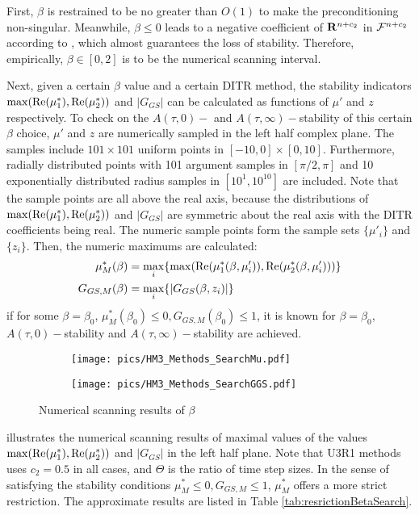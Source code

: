 First, $\beta$ is restrained to be no greater than $O(1)$ to make
the preconditioning non-singular.
Meanwhile, $\beta\leq 0$ leads to a negative coefficient of $\mathbf{R}^{n+c_2}$
in $\mathcal{F}^{n+c_2}$ according to , which almost
guarantees the loss of stability. Therefore, empirically, $\beta\in[0,2]$
is to be the numerical scanning interval.

Next, given a certain $\beta$ value and a certain DITR method, the
stability indicators $\max(\mathrm{Re}(\mu^*_1),\mathrm{Re}(\mu^*_2))$ and $|G_{GS}|$
can be calculated as functions of $\mu'$ and $z$ respectively.
To check on the $A(\tau,0)-$ and $A(\tau,\infty)-$stability of this
certain $\beta$ choice, $\mu'$ and $z$ are numerically sampled
in the left half complex plane. The samples include $101\times101$
uniform points in $[-10,0]\times[0,10]$. Furthermore, radially distributed
points with 101 argument samples in $[\pi/2,\pi]$ and 10 exponentially
distributed radius samples in $[10^1, 10^{10}]$ are included.
Note that the sample points are all above the real axis, because the
distributions of $\max(\mathrm{Re}(\mu^*_1),\mathrm{Re}(\mu^*_2))$ and $|G_{GS}|$
are symmetric about the real axis with the DITR coefficients being real.
The numeric sample points form the sample
sets $\{\mu'_i\}$ and $\{z_i\}$. Then, the numeric maximums are
calculated:
\begin{equation}
    \begin{aligned}
        \mu^*_{M}(\beta) & = \max_{i}\{\max(\mathrm{Re}(\mu^*_1(\beta,\mu'_i)),\mathrm{Re}(\mu^*_2(\beta,\mu'_i)))\} \\
        G_{GS,M}(\beta)  & = \max_{i}\{|G_{GS}(\beta,z_i)|\}
    \end{aligned}
\end{equation}
if for some $\beta=\beta_0$, $\mu^*_{M}(\beta_0) \leq 0,G_{GS,M}(\beta_0) \leq 1$,
it is known for  $\beta=\beta_0$, $A(\tau,0)-$stability and
$A(\tau,\infty)-$stability are achieved.


\begin{figure}[htbp]
    \centering
    \begin{subfigure}{0.5\textwidth}
        \texttt{[image: pics/HM3\_Methods\_SearchMu.pdf]}
    \end{subfigure}\hfill
    \begin{subfigure}{0.5\textwidth}
        \texttt{[image: pics/HM3\_Methods\_SearchGGS.pdf]}
    \end{subfigure}
    \caption{Numerical scanning results of $\beta$}
    \label{fig:MuGGSSearch}
\end{figure}
 illustrates the numerical scanning
results of maximal values of the values
$\max(\mathrm{Re}(\mu^*_1),\mathrm{Re}(\mu^*_2))$ and $|G_{GS}|$ in the left
half plane. Note that U3R1 methods uses $c_2=0.5$ in all cases, and $\Theta$ is
the ratio of time step sizes.
In the sense of satisfying the stability conditions $\mu^*_{M} \leq 0,G_{GS,M} \leq 1$,
$\mu^*_{M}$ offers a more strict restriction.
The approximate results are listed in Table \ref{tab:resrictionBetaSearch}.

